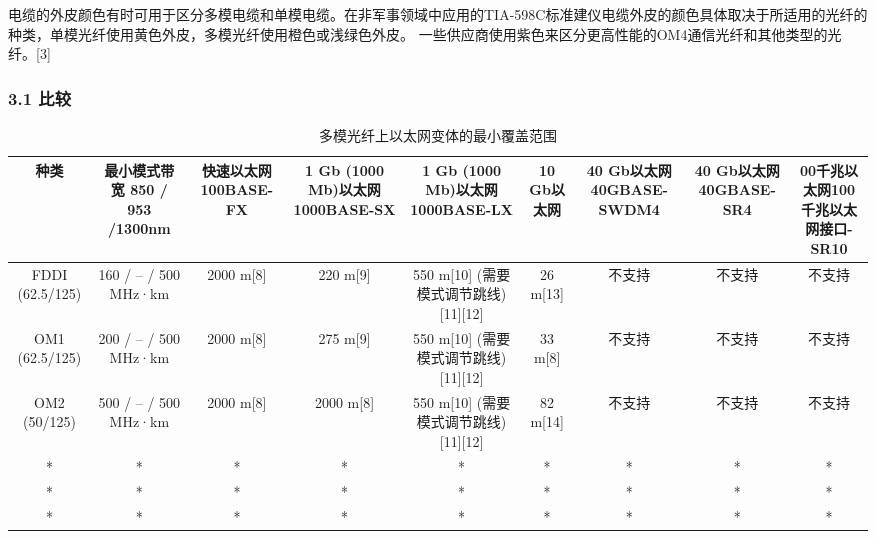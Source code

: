 电缆的外皮颜色有时可用于区分多模电缆和单模电缆。在非军事领域中应用的TIA-598C标准建仪电缆外皮的颜色具体取决于所适用的光纤的种类，单模光纤使用黄色外皮，多模光纤使用橙色或浅绿色外皮。 一些供应商使用紫色来区分更高性能的OM4通信光纤和其他类型的光纤。[3]

\subsubsection{3.1 比较 }
\begin{table}[ht]
\centering
\caption{多模光纤上以太网变体的最小覆盖范围}\label{tab_DMGQ1}
\begin{tabular}{|c|c|c|c|c|c|c|c|c|}
\hline
种类 & 最小模式带宽 
850 / 953 /1300nm& 快速以太网100BASE-FX & 1 Gb (1000 Mb)以太网1000BASE-SX & 1 Gb (1000 Mb)以太网1000BASE-LX & 10 Gb以太网 & 40 Gb以太网
40GBASE-SWDM4& 40 Gb以太网40GBASE-SR4 &00千兆以太网100千兆以太网接口-SR10 \\
\hline
FDDI (62.5/125) &160 / – / 500 MHz·km& 2000 m[8] &220 m[9] & 550 m[10] (需要模式调节跳线)[11][12]& 26 m[13] & 不支持& 不支持 & 不支持 \\
\hline
OM1 (62.5/125) & 200 / – / 500 MHz·km &2000 m[8]& 275 m[9] & 550 m[10] (需要模式调节跳线)[11][12] & 33 m[8]& 不支持 & 不支持 & 不支持 \\
\hline
OM2 (50/125)& 500 / – / 500 MHz·km &2000 m[8]& 2000 m[8] & 550 m[10] (需要模式调节跳线)[11][12]& 82 m[14]&不支持 &不支持& 不支持\\
\hline
* & * & * & * & * & * & * & * & * \\
\hline
* & * & * & * & * & * & * & * & * \\
\hline
* & * & * & * & * & * & * & * & * \\
\hline
\end{tabular}
\end{table}


